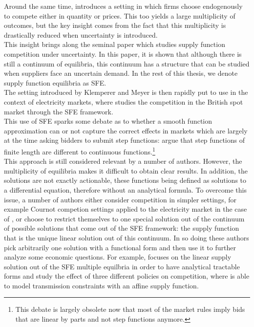 Around the same time, \cite{klemperer1986price} introduces a setting in which firms choose endogenously to compete either in quantity or prices. This too yields a large multiplicity of outcomes, but the key insight comes from the fact that this multiplicity is drastically reduced when uncertainty is introduced.\\

This insight brings along the seminal paper \cite{KM} which studies supply function competition under uncertainty. In this paper, it is shown that although there is still a continuum of equilibria, this continuum has a structure that can be studied when suppliers face an uncertain demand. In the rest of this thesis, we denote supply function equilibria as SFE. \\

The setting introduced by Klemperer and Meyer is then rapidly put to use in the context of electricity markets, where \cite{Newgreen} studies the competition in the British spot market through the SFE framework. \\

This use of SFE sparks some debate as to whether a smooth function approximation can or not capture the correct effects in markets which are largely at the time asking bidders to submit step functions:  \cite{von1993spot} argue that step functions of finite length are different to continuous functions.\footnote{This debate is largely obsolete now that most of the market rules imply bids that are linear by parts and not step functions anymore.}\\

This approach is still considered relevant by a number of authors. However, the multiplicity of equilibria makes it difficult to obtain clear results. In addition, the solutions are not exactly actionable, these functions being defined as solutions to a differential equation, therefore without an analytical formula. To overcome this issue, a number of authors either consider competition in simpler settings, for example Cournot competion settings applied to the electricity market in the case of \cite{borenstein1999empirical}, or choose to restrict themselves to one special solution out of the continuum of possible solutions that come out of the SFE framework: the supply function that is the unique linear solution out of this continuum. In so doing these authors pick arbitrarily one solution with a functional form and then use it to further analyze some economic questions. For example, \cite{green1996increasing} focuses on the linear supply solution out of the SFE multiple equilbria in order to have analytical tractable forms and study the effect of three different policies on competition, where 
\cite{hobbs2000strategic} is able to model transmission constraints with an affine supply function.\\

